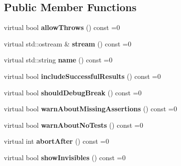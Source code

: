 \subsection*{Public Member Functions}
\begin{DoxyCompactItemize}
\item 
\mbox{\label{structCatch_1_1IConfig_aadb95f849359de1e6eb915aab063e542}} 
virtual bool {\bfseries allow\+Throws} () const =0
\item 
\mbox{\label{structCatch_1_1IConfig_aa4c3fe0825e7e6ebdcfa6abc7abf3617}} 
virtual std\+::ostream \& {\bfseries stream} () const =0
\item 
\mbox{\label{structCatch_1_1IConfig_aa2315800a05c19db71518b1edc39d43b}} 
virtual std\+::string {\bfseries name} () const =0
\item 
\mbox{\label{structCatch_1_1IConfig_a2f1b0391019b9ce69921527a684eab23}} 
virtual bool {\bfseries include\+Successful\+Results} () const =0
\item 
\mbox{\label{structCatch_1_1IConfig_a5b886c5aad9001e90f63a7cf0726af63}} 
virtual bool {\bfseries should\+Debug\+Break} () const =0
\item 
\mbox{\label{structCatch_1_1IConfig_a75d970c495a28e46b8e9b04a1d32149f}} 
virtual bool {\bfseries warn\+About\+Missing\+Assertions} () const =0
\item 
\mbox{\label{structCatch_1_1IConfig_a30590623e3918825f2896c2262bf6fe3}} 
virtual bool {\bfseries warn\+About\+No\+Tests} () const =0
\item 
\mbox{\label{structCatch_1_1IConfig_a363f3388a439d02217f37198eff96744}} 
virtual int {\bfseries abort\+After} () const =0
\item 
\mbox{\label{structCatch_1_1IConfig_aa288bf92ccd0aafd85409d8aefdf738c}} 
virtual bool {\bfseries show\+Invisibles} () const =0
\item 
\mbox{\label{structCatch_1_1IConfig_abaa97d281484278291f0d3db6d404aeb}} 

\end{DoxyCompactItemize}
